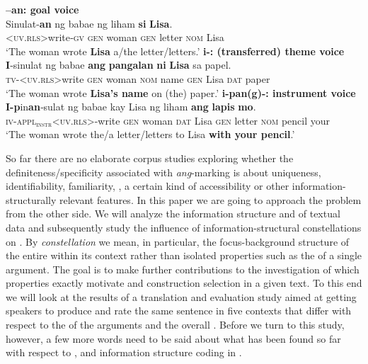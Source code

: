 \documentclass[output=paper,
,modfonts
,nonflat]{langsci/langscibook}
\begin{document}
\begin{exe}
\ex\label{peripheral1}
\begin{xlist}
\ex\label{write_gv1} \textbf{–an: goal voice}\\
\gll S{\USSmaller}in{\USGreater}ulat-\textbf{an}    ng babae    ng liham    \textbf{si} \textbf{Lisa}.\\
     <\textsc{uv.rls}>write‐\textsc{gv} \textsc{gen} woman   \textsc{gen} letter \textsc{nom} Lisa\\ 
\glt `The woman wrote \textbf{Lisa} a/the letter/letters.'
\ex\label{write_ttv1} \textbf{i-: (transferred) theme voice}\\
\gll \textbf{I}‐s{\USSmaller}in{\USGreater}ulat    ng babae    \textbf{ang} \textbf{pangalan}    \textbf{ni} \textbf{Lisa} sa papel.\\
 \textsc{tv-<uv.rls>}write \textsc{gen} woman \textsc{nom} name   \textsc{gen} Lisa  \textsc{dat} paper\\
\glt `The woman wrote \textbf{Lisa’s name} on (the) paper.'
\ex\label{write_iv1} \textbf{i-pan(g)-: instrument voice}\\
\gll \textbf{I-p}{\USSmaller}in{\USGreater}\textbf{an}‐sulat         ng babae     kay Lisa    ng liham    \textbf{ang} \textbf{lapis} \textbf{mo}.\\ 
	\textsc{iv-appl$_\text{instr}$<uv.rls>}-write \textsc{gen} woman \textsc{dat} Lisa  \textsc{gen} letter \textsc{nom} pencil your\\
\glt `The woman wrote the/a letter/letters to Lisa \textbf{with your pencil}.'
\end{xlist}
\end{exe}

\noindent So far there are no elaborate corpus studies exploring whether the de\-fi\-nite\-ness/\-spe\-ci\-fi\-ci\-ty associated with \textit{ang}-marking is about uniqueness, identifiability, familiarity, , a certain kind of accessibility or other in\-for\-ma\-tion-struc\-tu\-ral\-ly relevant features. In this paper we are going to approach the problem from the other side. We will analyze the information structure and  of textual data and subsequently study the influence of information-structural constellations on . By \textit{constellation} we mean, in particular, the focus-background structure of the entire  within its  context rather than isolated properties such as the  of a single argument. The goal is to make further contributions to the investigation of which  properties exactly motivate  and construction selection in a given text. 
To this end we will look at the results of a  translation and evaluation study aimed at getting speakers to produce and rate the same sentence in five contexts that differ with respect to the  of the arguments and the overall . 
Before we turn to this study, however, a few more words need to be said about what has been found so far with respect to ,  and  information structure coding in . 
\end{document}

